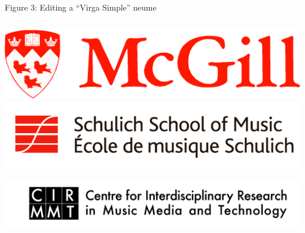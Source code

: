 \documentclass[final]{beamer}
\newlength{\onecolwid}
\newcommand{\blockSpace}{\vskip 0.75ex}
\begin{document}
\begin{frame}[fragile,t]
\begin{columns}
\begin{column}{\onecolwid}
\begin{block}{}
Figure 3: Editing a ``Virga Simple'' neume
\end{block}

\end{column}
\end{columns}


\begin{columns}
\begin{column}{\onecolwid}
\begin{block}{}
\vspace{-2cm}
\centering
\includegraphics[scale=0.2625]{images/McGill_logo}
\hspace{1.2cm} 
\includegraphics[scale=0.75]{images/Schulich_logo}

\vspace{0.75cm}

\includegraphics[scale=0.2625]{images/CIRMMT_logo}


\end{block}
\end{column}
\end{columns}
\end{frame}
\end{document}
